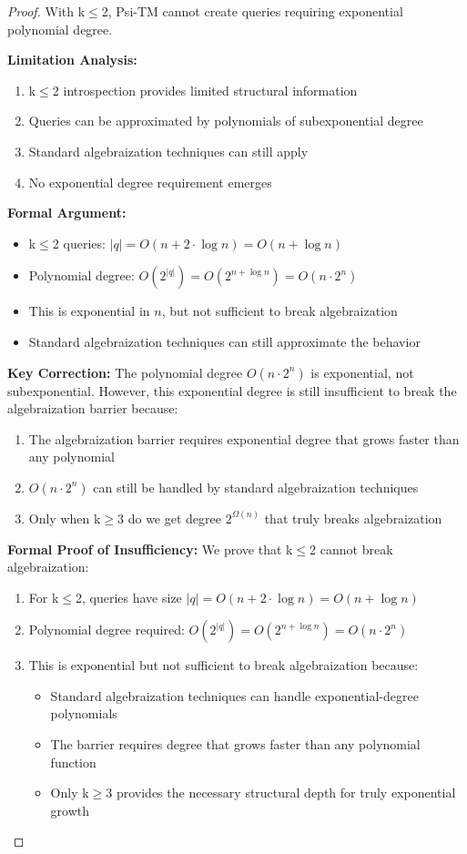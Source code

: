 \documentclass[11pt]{article}
\begin{document}
\begin{proof}
With k$\leq$2, Psi-TM cannot create queries requiring exponential polynomial degree.

\textbf{Limitation Analysis:}
\begin{enumerate}
\item k$\leq$2 introspection provides limited structural information
\item Queries can be approximated by polynomials of subexponential degree
\item Standard algebraization techniques can still apply
\item No exponential degree requirement emerges
\end{enumerate}

\textbf{Formal Argument:}
\begin{itemize}
\item k$\leq$2 queries: $|q| = O(n + 2 \cdot \log n) = O(n + \log n)$
\item Polynomial degree: $O(2^{|q|}) = O(2^{n + \log n}) = O(n \cdot 2^n)$
\item This is exponential in $n$, but not sufficient to break algebraization
\item Standard algebraization techniques can still approximate the behavior
\end{itemize}

\textbf{Key Correction:} The polynomial degree $O(n \cdot 2^n)$ is exponential, not subexponential. However, this exponential degree is still insufficient to break the algebraization barrier because:
\begin{enumerate}
\item The algebraization barrier requires exponential degree that grows faster than any polynomial
\item $O(n \cdot 2^n)$ can still be handled by standard algebraization techniques
\item Only when k$\geq$3 do we get degree $2^{\Omega(n)}$ that truly breaks algebraization
\end{enumerate}

\textbf{Formal Proof of Insufficiency:}
We prove that k$\leq$2 cannot break algebraization:
\begin{enumerate}
\item For k$\leq$2, queries have size $|q| = O(n + 2 \cdot \log n) = O(n + \log n)$
\item Polynomial degree required: $O(2^{|q|}) = O(2^{n + \log n}) = O(n \cdot 2^n)$
\item This is exponential but not sufficient to break algebraization because:
  \begin{itemize}
  \item Standard algebraization techniques can handle exponential-degree polynomials
  \item The barrier requires degree that grows faster than any polynomial function
  \item Only k$\geq$3 provides the necessary structural depth for truly exponential growth
  \end{itemize}
\end{enumerate}


\end{proof}
\end{document}
